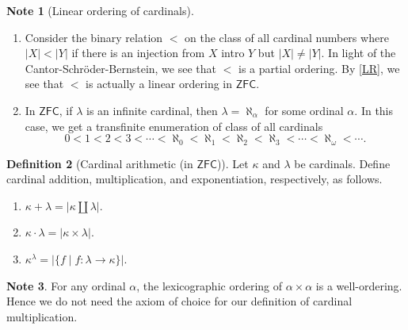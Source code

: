 \documentclass[10pt,letterpaper,cm]{nupset}
\theoremstyle{definition}
\newtheorem{definition}{Definition}[subsection]
\newtheorem{note}[definition]{Note}
\theoremstyle{theorem}
\theoremstyle{remark}
\newcommand{\1}{\mathbf{1}}
\newcommand{\0}{\vec 0}
\newcommand{\zfc}{\mathsf{ZFC}}
\begin{document}
\begin{note}[Linear ordering of cardinals]
\begin{enumerate}
\item Consider the binary relation $< $ on the class of all cardinal numbers where $\lvert{X}\rvert < \lvert{Y}\rvert$ if there is an injection from $X$ intro $Y$ but $\lvert{X}\rvert \ne \lvert{Y}\rvert$. In light of the Cantor-Schr\"oder-Bernstein, we see that $<$ is a partial ordering. By \cref{LR}, we see that $<$ is actually a linear ordering in $\zfc$. 
\item In $\zfc$, if $\lambda$ is an infinite cardinal, then $\lambda = \aleph_{\alpha}$ for some ordinal $\alpha$. In this case, we get a transfinite enumeration of class of all cardinals
\[
0 < 1 < 2 < 3 < \cdots < \aleph_0 < \aleph_1 < \aleph_2 < \aleph_3 <  \cdots < \aleph_{\omega} < \cdots
.\]
\end{enumerate}
\end{note}

\begin{definition}[Cardinal arithmetic (in $\zfc$)] Let $\kappa$ and $\lambda$ be cardinals. Define cardinal addition, multiplication, and exponentiation, respectively, as follows.
\begin{enumerate}
\item $\kappa + \lambda = \lvert{\kappa \coprod \lambda}\rvert$.
\item $\kappa \cdot \lambda = \lvert{\kappa \times \lambda}\rvert $.
\item $\kappa^{\lambda} = \lvert{\{f \mid f : \lambda \to \kappa \}}\rvert$.
\end{enumerate} 
\end{definition}

\begin{note}
For any ordinal $\alpha$,  the lexicographic ordering of $\alpha \times \alpha$ is a well-ordering. Hence we do not need the axiom of choice for our definition of cardinal multiplication. 
\end{note}
\end{document}
